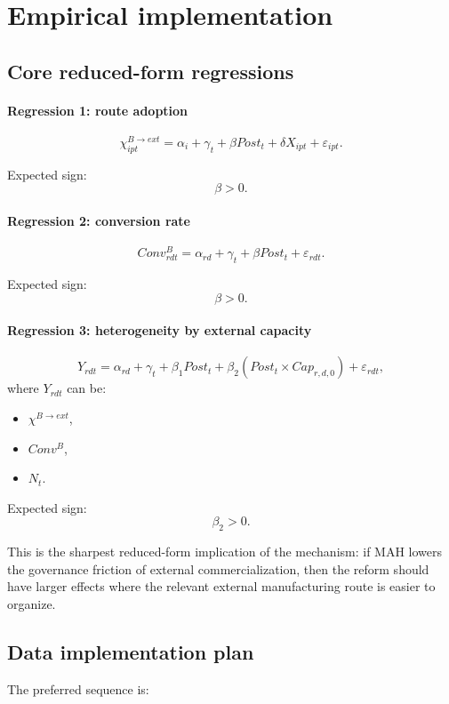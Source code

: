 \documentclass[12pt]{article}
\begin{document}
\section{Empirical implementation}

\subsection{Core reduced-form regressions}

\paragraph{Regression 1: route adoption}
\[
\chi^{B\to ext}_{ipt}
=
\alpha_i+\gamma_t+\beta Post_t+\delta X_{ipt}+\varepsilon_{ipt}.
\]

Expected sign:
\[
\beta>0.
\]

\paragraph{Regression 2: conversion rate}
\[
Conv^B_{rdt}
=
\alpha_{rd}+\gamma_t+\beta Post_t+\varepsilon_{rdt}.
\]

Expected sign:
\[
\beta>0.
\]

\paragraph{Regression 3: heterogeneity by external capacity}
\[
Y_{rdt}
=
\alpha_{rd}
+
\gamma_t
+
\beta_1 Post_t
+
\beta_2(Post_t\times Cap_{r,d,0})
+
\varepsilon_{rdt},
\]
where \(Y_{rdt}\) can be:
\begin{itemize}[leftmargin=2em]
    \item \(\chi^{B\to ext}\),
    \item \(Conv^B\),
    \item \(N_t\).
\end{itemize}

Expected sign:
\[
\beta_2>0.
\]

This is the sharpest reduced-form implication of the mechanism:
if MAH lowers the governance friction of external commercialization, then the reform should
have larger effects where the relevant external manufacturing route is easier to organize.

\subsection{Data implementation plan}

The preferred sequence is:
\end{document}
